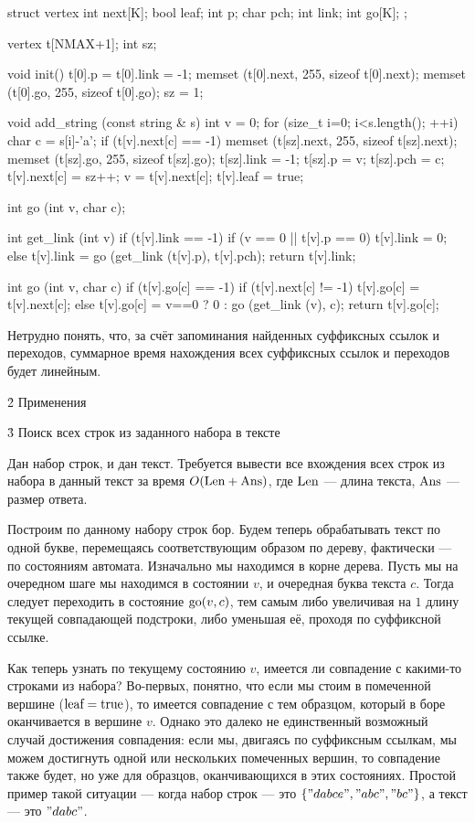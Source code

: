 \code
struct vertex {
	int next[K];
	bool leaf;
	int p;
	char pch;
	int link;
	int go[K];
};

vertex t[NMAX+1];
int sz;

void init() {
	t[0].p = t[0].link = -1;
	memset (t[0].next, 255, sizeof t[0].next);
	memset (t[0].go, 255, sizeof t[0].go);
	sz = 1;
}

void add_string (const string & s) {
	int v = 0;
	for (size_t i=0; i<s.length(); ++i) {
		char c = s[i]-'a';
		if (t[v].next[c] == -1) {
			memset (t[sz].next, 255, sizeof t[sz].next);
			memset (t[sz].go, 255, sizeof t[sz].go);
			t[sz].link = -1;
			t[sz].p = v;
			t[sz].pch = c;
			t[v].next[c] = sz++;
		}
		v = t[v].next[c];
	}
	t[v].leaf = true;
}

int go (int v, char c);

int get_link (int v) {
	if (t[v].link == -1)
		if (v == 0 || t[v].p == 0)
			t[v].link = 0;
		else
			t[v].link = go (get_link (t[v].p), t[v].pch);
	return t[v].link;
}

int go (int v, char c) {
	if (t[v].go[c] == -1)
		if (t[v].next[c] != -1)
			t[v].go[c] = t[v].next[c];
		else
			t[v].go[c] = v==0 ? 0 : go (get_link (v), c);
	return t[v].go[c];
}
\endcode

Нетрудно понять, что, за счёт запоминания найденных суффиксных ссылок и переходов, суммарное время нахождения всех суффиксных ссылок и переходов будет линейным.


\h2{ Применения }

\h3{ Поиск всех строк из заданного набора в тексте }

Дан набор строк, и дан текст. Требуется вывести все вхождения всех строк из набора в данный текст за время $O ({\rm Len + Ans})$, где $\rm Len$ --- длина текста, $\rm Ans$ --- размер ответа.

Построим по данному набору строк бор. Будем теперь обрабатывать текст по одной букве, перемещаясь соответствующим образом по дереву, фактически --- по состояниям автомата. Изначально мы находимся в корне дерева. Пусть мы на очередном шаге мы находимся в состоянии $v$, и очередная буква текста $c$. Тогда следует переходить в состояние ${\rm go} (v, c)$, тем самым либо увеличивая на $1$ длину текущей совпадающей подстроки, либо уменьшая её, проходя по суффиксной ссылке.

Как теперь узнать по текущему состоянию $v$, имеется ли совпадение с какими-то строками из набора? Во-первых, понятно, что если мы стоим в помеченной вершине ($\rm leaf=true$), то имеется совпадение с тем образцом, который в боре оканчивается в вершине $v$. Однако это далеко не единственный возможный случай достижения совпадения: если мы, двигаясь по суффиксным ссылкам, мы можем достигнуть одной или нескольких помеченных вершин, то совпадение также будет, но уже для образцов, оканчивающихся в этих состояниях. Простой пример такой ситуации --- когда набор строк --- это $\{ "dabce", "abc", "bc" \}$, а текст --- это $"dabc"$.


